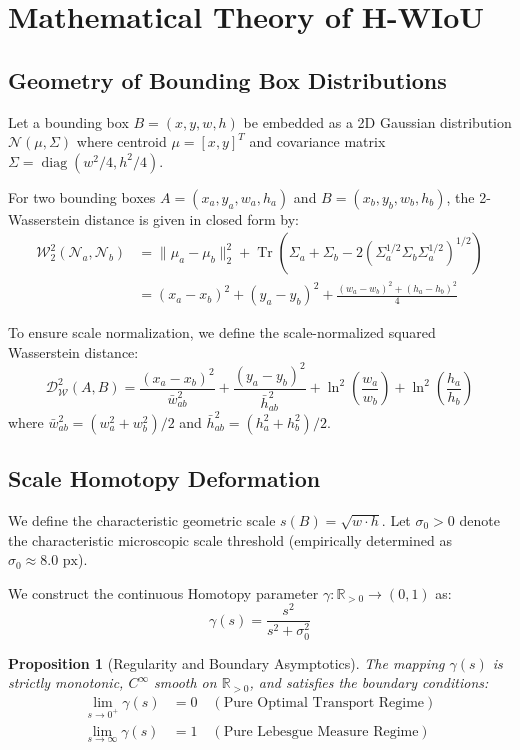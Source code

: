 \documentclass[10pt,twocolumn]{article}
\newtheorem{proposition}{Proposition}
\begin{document}
\section{Mathematical Theory of H-WIoU}

\subsection{Geometry of Bounding Box Distributions}
Let a bounding box $B = (x, y, w, h)$ be embedded as a 2D Gaussian distribution $\mathcal{N}(\mu, \Sigma)$ where centroid $\mu = [x, y]^T$ and covariance matrix $\Sigma = \operatorname{diag}(w^2/4, h^2/4)$.

For two bounding boxes $A = (x_a, y_a, w_a, h_a)$ and $B = (x_b, y_b, w_b, h_b)$, the 2-Wasserstein distance is given in closed form by:
\begin{align}
    \mathcal{W}_2^2(\mathcal{N}_a, \mathcal{N}_b) &= \|\mu_a - \mu_b\|_2^2 + \operatorname{Tr}\left(\Sigma_a + \Sigma_b - 2(\Sigma_a^{1/2} \Sigma_b \Sigma_a^{1/2})^{1/2}\right) \nonumber \\
    &= (x_a - x_b)^2 + (y_a - y_b)^2 + \frac{(w_a - w_b)^2 + (h_a - h_b)^2}{4}
\end{align}

To ensure scale normalization, we define the scale-normalized squared Wasserstein distance:
\begin{equation}
    \mathcal{D}_{\mathcal{W}}^2(A, B) = \frac{(x_a - x_b)^2}{\bar{w}_{ab}^2} + \frac{(y_a - y_b)^2}{\bar{h}_{ab}^2} + \ln^2\left(\frac{w_a}{w_b}\right) + \ln^2\left(\frac{h_a}{h_b}\right)
\end{equation}
where $\bar{w}_{ab}^2 = (w_a^2 + w_b^2)/2$ and $\bar{h}_{ab}^2 = (h_a^2 + h_b^2)/2$.

\subsection{Scale Homotopy Deformation}
We define the characteristic geometric scale $s(B) = \sqrt{w \cdot h}$. Let $\sigma_0 > 0$ denote the characteristic microscopic scale threshold (empirically determined as $\sigma_0 \approx 8.0\text{ px}$).

We construct the continuous Homotopy parameter $\gamma: \mathbb{R}_{>0} \to (0, 1)$ as:
\begin{equation}
    \gamma(s) = \frac{s^2}{s^2 + \sigma_0^2}
\end{equation}

\begin{proposition}[Regularity and Boundary Asymptotics]
The mapping $\gamma(s)$ is strictly monotonic, $C^\infty$ smooth on $\mathbb{R}_{>0}$, and satisfies the boundary conditions:
\begin{align}
    \lim_{s \to 0^+} \gamma(s) &= 0 \quad (\text{Pure Optimal Transport Regime}) \\
    \lim_{s \to \infty} \gamma(s) &= 1 \quad (\text{Pure Lebesgue Measure Regime})
\end{align}
\end{proposition}
\end{document}
